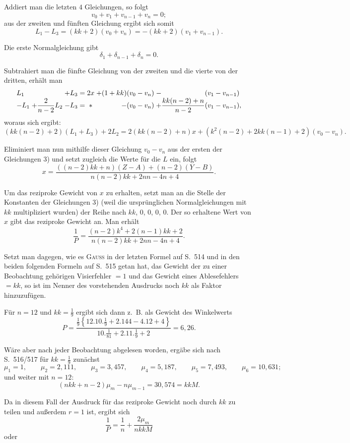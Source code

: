 Addiert man die letzten $4$ Gleichungen, so folgt
\[
 v_0+v_1+v_{n-1}+v_n=0;
\]
aus der zweiten und fünften Gleichung ergibt sich somit
\[
 L_1-L_3=(kk+2)(v_0+v_n)=-(kk+2)(v_1+v_{n-1}).
\]

Die erste Normalgleichung gibt
\[
 \delta_1+\delta_{n-1}+\delta_n=0.
\]

Subtrahiert man die fünfte Gleichung von der zweiten und die vierte von der dritten, erhält man
\[
\begin{array}{@{}l@{\;}r@{\;}r@{\;}c@{\;}c@{\;}r@{\;}l@{}}
 L_1 && +L_3 &=& 2x & +(1+kk)(v_0-v_n) & -\hphantom{\dfrac{kk(n-2)+n}{n-2}}(v_1-v_{n-1})\\
 -L_1 & +\dfrac{2}{n-2}L_2 & -L_3 &=& * & -(v_0-v_n) & +\dfrac{kk(n-2)+n}{n-2}(v_1-v_{n-1}),
\end{array}
\]
woraus sich ergibt:
\[
 (kk(n-2)+2)(L_1+L_3)+2L_2=2(kk(n-2)+n)x+
 (k^2(n-2)+2kk(n-1)+2)(v_0-v_n).
\]

Eliminiert man nun mithilfe dieser Gleichung $v_0-v_n$ aus der ersten der Gleichungen 3) und setzt zugleich die Werte für die $L$ ein, folgt
\[
 x=\frac{((n-2)kk+n)(Z-A)+(n-2)(Y-B)}{n(n-2)kk+2nn-4n+4}.
\]

Um das reziproke Gewicht von $x$ zu erhalten, setzt man an die Stelle der Konstanten der Gleichungen 3) (weil die ursprünglichen Normalgleichungen mit $kk$ multipliziert wurden) der Reihe nach $kk$, $0$, $0$, $0$, $0$. Der so erhaltene Wert von $x$ gibt das reziproke Gewicht an. Man erhält
\[
 \frac{1}{P}=\frac{(n-2)k^4+2(n-1)kk+2}{n(n-2)kk+2nn-4n+4}.
\]

Setzt man dagegen, wie es \textsc{Gauss} in der letzten Formel auf S.~514 und in den beiden folgenden Formeln auf S.~515 getan hat, das Gewicht der zu einer Beobachtung gehörigen Visierfehler $=1$ und das Gewicht eines Ablesefehlers $=kk$, so ist im Nenner des vorstehenden Ausdrucks noch $kk$ als Faktor hinzuzufügen.

Für $n=12$ und $kk=\frac19$ ergibt sich dann z.~B. als Gewicht des Winkelwerts
\[
 P=\frac{\frac19\left\{12.10.\frac19+2.144-4.12+4\right\}}{10.\frac{1}{81}+2.11.\frac19+2}
 =6{,}26.
\]

Wäre aber nach jeder Beobachtung abgelesen worden, ergäbe sich nach S.~516/517 für $kk=\frac19$ zunächst
\[
 \mu_1=1,\qquad \mu_2=2{,}111,\qquad \mu_3=3{,}457,\qquad
 \mu_4=5{,}187,\qquad \mu_5=7{,}493,\qquad \mu_6=10{,}631;
\]
und weiter mit $n=12$:
\[
 (nkk+n-2)\mu_m-n\mu_{m-1}=30{,}574=kkM.
\]

Da in diesem Fall der Ausdruck für das reziproke Gewicht noch durch $kk$ zu teilen und außerdem $r=1$ ist, ergibt sich
\[
 \frac{1}{P}=\frac{1}{n}+\frac{2\mu_m}{nkkM}
\]
oder

